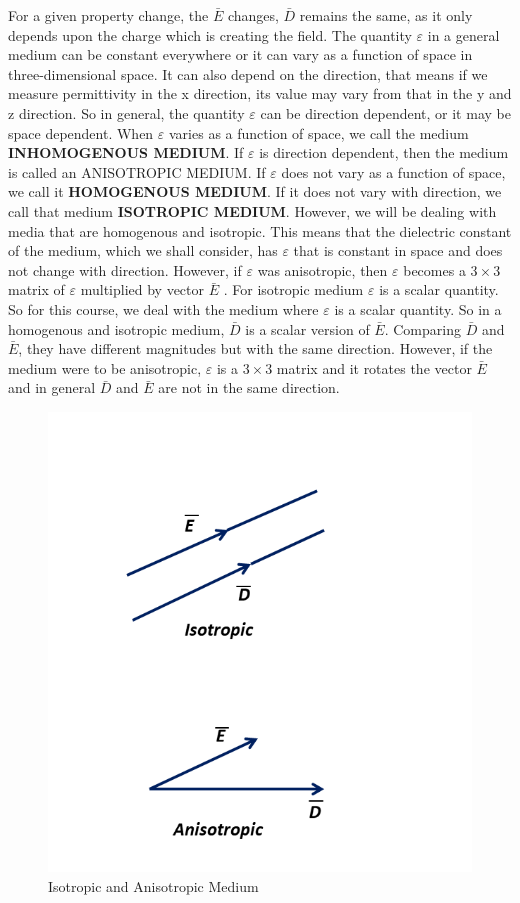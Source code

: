 For a given property change, the $\bar{E}$ changes, $\bar{D}$ remains the same, as it only depends upon the charge which is creating the field. The quantity $\varepsilon$ in a general medium can be constant everywhere or it can vary as a function of space in three-dimensional space. It can also depend on the direction, that means if we measure permittivity in the x direction, its value may vary from that in the y and z direction. So in general, the quantity  $\varepsilon$  can be direction dependent, or it may be space dependent. When  $\varepsilon$  varies as a function of space, we call the medium \textbf{INHOMOGENOUS MEDIUM}. If  $\varepsilon$  is direction dependent, then the medium is called an ANISOTROPIC MEDIUM. If  $\varepsilon$ does not vary as a function of space, we call it \textbf{HOMOGENOUS MEDIUM}. If it does not vary with direction, we call that medium \textbf{ISOTROPIC MEDIUM}.
However, we will be dealing with media that are homogenous and isotropic. This means that the dielectric constant of the medium, which we shall consider, has  $\varepsilon$ that is constant in space and does not change with direction. However, if  $\varepsilon$  was anisotropic, then  $\varepsilon$  becomes a $3\times 3$ matrix of  $\varepsilon$  multiplied by vector $\bar{E}$ . For isotropic medium  $\varepsilon$  is a scalar quantity. So for this course, we deal with the medium where  $\varepsilon$  is a scalar quantity.
So in a homogenous and isotropic medium,  $\bar{D}$ is a scalar version of  $\bar{E}$. Comparing  $\bar{D}$ and  $\bar{E}$, they have different magnitudes but with the same direction. However, if the medium were to be anisotropic,  $\varepsilon$ is a $3\times 3$ matrix and it rotates the vector  $\bar{E}$ and in general  $\bar{D}$ and  $\bar{E}$ are not in the same direction.

\begin{figure}
\centering
\includegraphics[width=0.7\linewidth]{./graphics/isotropicAniso}
\caption{Isotropic and Anisotropic Medium}
\end{figure}

